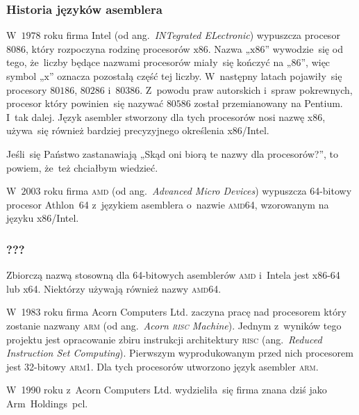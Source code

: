 \documentclass[10pt,t]{beamer}
\begin{document}
\begin{frame}
  \frametitle{Historia języków asemblera}


  W~$1978$ roku firma Intel (od ang.~\textit{INTegrated ELectronic})
  wypuszcza procesor $8086$, który rozpoczyna rodzinę procesorów
  $\text{x}86$. Nazwa „$\text{x}86$” wywodzie~się od tego, że~liczby
  będące nazwami procesorów miały~się kończyć na „$86$”, więc symbol
  „$\text{x}$” oznacza pozostałą część tej liczby. W~następny latach
  pojawiły~się procesory $80186$, $80286$ i~$80386$. Z~powodu praw
  autorskich i~spraw pokrewnych, procesor który powinien~się nazywać
  $80586$ został przemianowany na Pentium. I~tak dalej. Język asembler
  stworzony dla tych procesorów nosi nazwę \alert{x86}, używa~się również
  bardziej precyzyjnego określenia \alert{x86/Intel}.

  Jeśli~się Państwo zastanawiają „Skąd oni biorą te nazwy dla procesorów?”,
  to powiem, że~też chciałbym wiedzieć.

  W~$2003$ roku firma \textsc{amd} (od ang.~\textit{Advanced Micro Devices})
  wypuszcza 64-bitowy procesor Athlon~64 z~językiem asemblera o~nazwie
  \textsc{amd}64, wzorowanym na języku x86/Intel.

\end{frame}





\begin{frame}
  \frametitle{???}


  Zbiorczą nazwą stosowną dla 64-bitowych asemblerów \textsc{amd} i~Intela
  jest \alert{x86-64} lub \alert{x64}. Niektórzy używają również nazwy
  \alert{\textsc{amd}64}.

  W~1983 roku firma Acorn Computers Ltd. zaczyna pracę nad procesorem który
  zostanie nazwany \alert{\textsc{arm}} (od ang.~\textit{Acorn \textsc{risc}
    Machine}). Jednym z~wyników tego projektu jest opracowanie zbiru
  instrukcji architektury \textsc{risc} (ang.~\textit{Reduced Instruction
    Set Computing}). Pierwszym wyprodukowanym przed nich procesorem jest
  32-bitowy \textsc{arm1}. Dla tych procesorów utworzono język asembler
  \alert{\textsc{arm}}.

  W~1990 roku z~Acorn Computers Ltd. wydzieliła~się firma znana dziś jako
  Arm~Holdings~pcl.

\end{frame}
\end{document}
